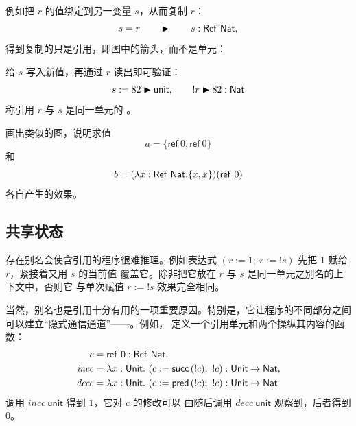 \begin{center}
\end{center}

例如把 \(r\) 的值绑定到另一变量 \(s\)，从而复制 \(r\)：
\[
s=r\qquad\blacktriangleright\qquad s:\mathsf{Ref}\ \mathsf{Nat},
\]
得到复制的只是引用，即图中的箭头，而不是单元：

\begin{center}
\end{center}

给 \(s\) 写入新值，再通过 \(r\) 读出即可验证：
\[
s:=82\blacktriangleright\mathsf{unit},
\qquad
!r\blacktriangleright82:\mathsf{Nat}
\]
称引用 \(r\) 与 \(s\) 是同一单元的
。

\begin{exercise}[\(\star\)]
\label{ex:13.1.1}
画出类似的图，说明求值
\[
a=\{\mathsf{ref}\ 0,\mathsf{ref}\ 0\}
\]
和
\[
b=(\lambda x:\tapltype{Ref}\ \tapltype{Nat}.\{x,x\})
  (\mathsf{ref}\ 0)
\]
各自产生的效果。
\end{exercise}

\subsection*{共享状态}

存在别名会使含引用的程序很难推理。例如表达式
\((r:=1;\ r:=!s)\) 先把 \(1\) 赋给 \(r\)，紧接着又用 \(s\) 的当前值
覆盖它。除非把它放在 \(r\) 与 \(s\) 是同一单元之别名的上下文中，否则它
与单次赋值 \(r:=!s\) 效果完全相同。

当然，别名也是引用十分有用的一项重要原因。特别是，它让程序的不同部分之间
可以建立“隐式通信通道”——。例如，
定义一个引用单元和两个操纵其内容的函数：
\[
\begin{aligned}
c&=\mathsf{ref}\ 0:\mathsf{Ref}\ \mathsf{Nat},\\
\mathit{incc}&=\lambda x:\mathsf{Unit}.\
 (c:=\mathsf{succ}\,(!c);\ !c):
 \mathsf{Unit}\to\mathsf{Nat},\\
\mathit{decc}&=\lambda x:\mathsf{Unit}.\
 (c:=\mathsf{pred}\,(!c);\ !c):
 \mathsf{Unit}\to\mathsf{Nat}
\end{aligned}
\]
调用 \(\mathit{incc}\ \mathsf{unit}\) 得到 \(1\)，它对 \(c\) 的修改可以
由随后调用 \(\mathit{decc}\ \mathsf{unit}\) 观察到，后者得到 \(0\)。

